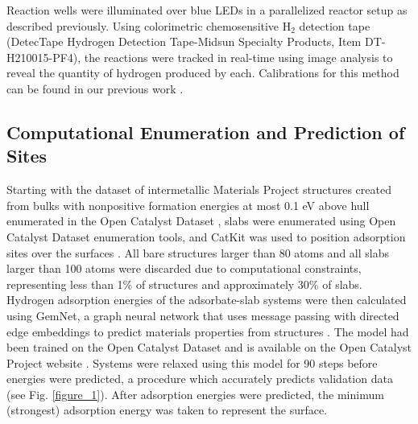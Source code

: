 \documentclass[preprint,12pt]{elsarticle}
\begin{document}
Reaction wells were illuminated over blue LEDs in a parallelized reactor setup as described previously. Using colorimetric chemosensitive H$_2$ detection tape (DetecTape Hydrogen Detection Tape-Midsun Specialty Products, Item DT-H210015-PF4), the reactions were tracked in real-time using image analysis to reveal the quantity of hydrogen produced by each. Calibrations for this method can be found in our previous work \cite{lopato2020parallelized}.


\subsection{Computational Enumeration and Prediction of Sites}\label{Section:Experimental/Enumeration}
Starting with the dataset of intermetallic Materials Project structures created from bulks with nonpositive formation energies at most 0.1 eV above hull enumerated in the Open Catalyst Dataset \cite{chanussot2021open,ong2013python}, slabs were enumerated using Open Catalyst Dataset enumeration tools, and CatKit was used to position adsorption sites over the surfaces \cite{boes2019graph}. All bare structures larger than 80 atoms and all slabs larger than 100 atoms were discarded due to computational constraints, representing less than 1\% of structures and approximately 30\% of slabs. Hydrogen adsorption energies of the adsorbate-slab systems were then calculated using GemNet, a graph neural network that uses message passing with directed edge embeddings to predict materials properties from structures \cite{klicpera2021gemnet}. The model had been trained on the Open Catalyst Dataset and is available on the Open Catalyst Project website \cite{chanussot2021open}. Systems were relaxed using this model for 90 steps before energies were predicted, a procedure which accurately predicts validation data (see Fig. \ref{figure_1}). After adsorption energies were predicted, the minimum (strongest) adsorption energy was taken to represent the surface. 
\end{document}
